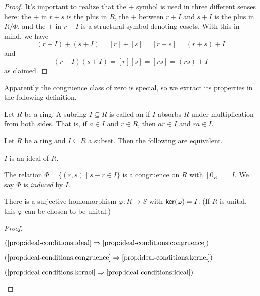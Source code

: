 \begin{proof}
It's important to realize that the \(+\) symbol is used in three different senses here: the \(+\) in \(r+s\) is the plus in \(R\), the \(+\) between \(r+I\) and \(s+I\) is the plus in \(R/\Phi\), and the \(+\) in \(r+I\) is a structural symbol denoting cosets. With this in mind, we have \[ (r+I)+(s+I) = [r] + [s] = [r+s] = (r+s)+I \] and \[ (r+I)(s+I) = [r][s] = [rs] = (rs)+I \] as claimed.
\end{proof}

Apparently the congruence class of zero is special, so we extract its properties in the following definition.

\begin{dfn}[Ideal]
Let \(R\) be a ring. A subring \(I \subseteq R\) is called an  if \(I\) absorbs \(R\) under multiplication from both sides. That is, if \(a \in I\) and \(r \in R\), then \(ar \in I\) and \(ra \in I\). 
\end{dfn}

\begin{prop} \label{prop:ideal-conditions}
Let \(R\) be a ring and \(I \subseteq R\) a subset. Then the following are equivalent.
\begin{proplist}
\item \(I\) is an ideal of \(R\). \label{prop:ideal-conditions:ideal}
\item The relation \(\Phi = \{ (r,s) \mid s-r \in I \}\) is a congruence on \(R\) with \([0_R] = I\). We say \(\Phi\) is \emph{induced} by \(I\). \label{prop:ideal-conditions:congruence}
\item There is a surjective homomorphism \(\varphi : R \rightarrow S\) with \( \mathsf{ker}(\varphi)  = I\). (If \(R\) is unital, this \(\varphi\) can be chosen to be unital.) \label{prop:ideal-conditions:kernel}
\end{proplist}
\end{prop}

\begin{proof}
\begin{inlineproplist}
\item[\((\ref{prop:ideal-conditions:ideal} \Rightarrow \ref{prop:ideal-conditions:congruence})\)]
\item[\((\ref{prop:ideal-conditions:congruence} \Rightarrow \ref{prop:ideal-conditions:kernel})\)]
\item[\((\ref{prop:ideal-conditions:kernel} \Rightarrow \ref{prop:ideal-conditions:ideal})\)] 
\end{inlineproplist} 
\end{proof}

